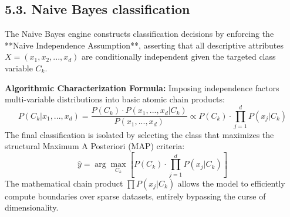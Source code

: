 \documentclass[../main.tex]{subfiles}
\begin{document}
\subsection{5.3. Naive Bayes classification}
The Naive Bayes engine constructs classification decisions by enforcing the **Naive Independence Assumption**, asserting that all descriptive attributes $X = (x_1, x_2, ..., x_d)$ are conditionally independent given the targeted class variable $C_k$.

\textbf{Algorithmic Characterization Formula:} Imposing independence factors multi-variable distributions into basic atomic chain products:
\begin{equation}
    P(C_k | x_1, ..., x_d) = \frac{P(C_k) \cdot P(x_1, ..., x_d | C_k)}{P(x_1, ..., x_d)} \propto P(C_k) \cdot \prod_{j=1}^{d} P(x_j | C_k)
\end{equation}
The final classification is isolated by selecting the class that maximizes the structural Maximum A Posteriori (MAP) criteria:
\begin{equation}
    \hat{y} = \arg\max_{C_k} \left[ P(C_k) \cdot \prod_{j=1}^{d} P(x_j | C_k) \right]
\end{equation}
The mathematical chain product $\prod P(x_j | C_k)$ allows the model to efficiently compute boundaries over sparse datasets, entirely bypassing the curse of dimensionality.
\end{document}
